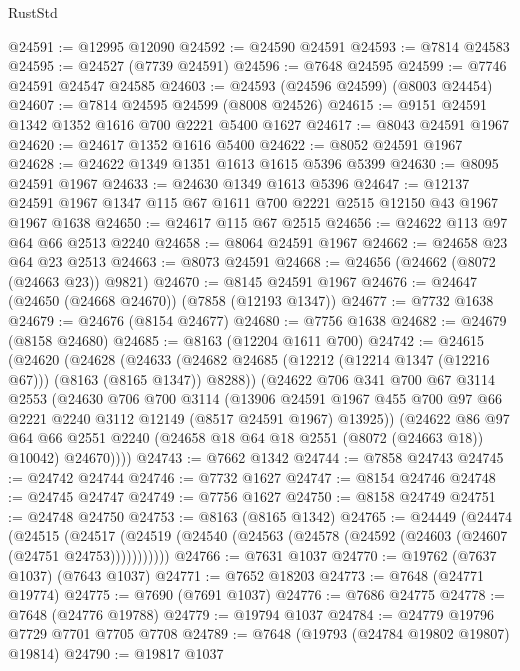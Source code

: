 \begin{lexlean}{RustStd}
\begin{coremodule}
{\begin{coremodule}
{{{{{{{{{{{{{{{{{{{{{{{{{{{{{{{{{{{{{{{{{{{{{{{{{{{{{@24591 := @12995 @12090
@24592 := @24590 @24591
@24593 := @7814 @24583
@24595 := @24527 (@7739 @24591)
@24596 := @7648 @24595
@24599 := @7746 @24591 @24547 @24585
@24603 := @24593 (@24596 @24599) (@8003 @24454)
@24607 := @7814 @24595 @24599 (@8008 @24526)
@24615 := @9151 @24591 @1342 @1352 @1616 @700 @2221 @5400 @1627
@24617 := @8043 @24591 @1967
@24620 := @24617 @1352 @1616 @5400
@24622 := @8052 @24591 @1967
@24628 := @24622 @1349 @1351 @1613 @1615 @5396 @5399
@24630 := @8095 @24591 @1967
@24633 := @24630 @1349 @1613 @5396
@24647 := @12137 @24591 @1967 @1347 @115 @67 @1611 @700 @2221 @2515 @12150 @43 @1967 @1967 @1638
@24650 := @24617 @115 @67 @2515
@24656 := @24622 @113 @97 @64 @66 @2513 @2240
@24658 := @8064 @24591 @1967
@24662 := @24658 @23 @64 @23 @2513
@24663 := @8073 @24591
@24668 := @24656 (@24662 (@8072 (@24663 @23)) @9821)
@24670 := @8145 @24591 @1967
@24676 := @24647 (@24650 (@24668 @24670)) (@7858 (@12193 @1347))
@24677 := @7732 @1638
@24679 := @24676 (@8154 @24677)
@24680 := @7756 @1638
@24682 := @24679 (@8158 @24680)
@24685 := @8163 (@12204 @1611 @700)
@24742 := @24615
    (@24620
      (@24628
        (@24633 (@24682 @24685 (@12212 (@12214 @1347 (@12216 @67))) (@8163 (@8165 @1347)) @8288))
        (@24622
          @706
          @341
          @700
          @67
          @3114
          @2553
          (@24630
            @706
            @700
            @3114
            (@13906
              @24591
              @1967
              @455
              @700
              @97
              @66
              @2221
              @2240
              @3112
              @12149
              (@8517 @24591 @1967)
              @13925))
          (@24622
            @86
            @97
            @64
            @66
            @2551
            @2240
            (@24658 @18 @64 @18 @2551 (@8072 (@24663 @18)) @10042)
            @24670))))
@24743 := @7662 @1342
@24744 := @7858 @24743
@24745 := @24742 @24744
@24746 := @7732 @1627
@24747 := @8154 @24746
@24748 := @24745 @24747
@24749 := @7756 @1627
@24750 := @8158 @24749
@24751 := @24748 @24750
@24753 := @8163 (@8165 @1342)
@24765 := @24449
    (@24474
      (@24515
        (@24517 (@24519 (@24540 (@24563 (@24578 (@24592 (@24603 (@24607 (@24751 @24753)))))))))))
@24766 := @7631 @1037
@24770 := @19762 (@7637 @1037) (@7643 @1037)
@24771 := @7652 @18203
@24773 := @7648 (@24771 @19774)
@24775 := @7690 (@7691 @1037)
@24776 := @7686 @24775
@24778 := @7648 (@24776 @19788)
@24779 := @19794 @1037
@24784 := @24779 @19796 @7729 @7701 @7705 @7708
@24789 := @7648 (@19793 (@24784 @19802 @19807) @19814)
@24790 := @19817 @1037
}}}}}}}}}}}}}}}}}}}}}}}}}}}}}}}}}}}}}}}}}}}}}}}}}}}}}
\end{coremodule}}
\end{coremodule}
\end{lexlean}
